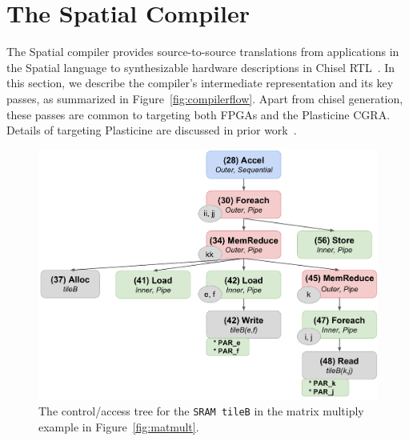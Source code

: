 \section{The Spatial Compiler}
\label{compiler}

The Spatial compiler provides source-to-source translations from applications in the Spatial language to synthesizable hardware descriptions in Chisel RTL~\cite{chisel}. 
In this section, we describe the compiler's intermediate representation and its key passes, as summarized in Figure~\ref{fig:compilerflow}.
Apart from chisel generation, these passes are common to targeting both FPGAs and the Plasticine CGRA. Details of targeting Plasticine are discussed in prior work~\cite{plasticine}.



\begin{figure}
\includegraphics[clip, width=0.9\columnwidth]{figs/control_tree_gemm.pdf}
\vspace{-10pt}
\caption{The control/access tree for the \texttt{\small{SRAM tileB}} in the matrix multiply example in Figure~\ref{fig:matmult}. 
\vspace{-5pt} 
}
\label{fig:controlTree}
\end{figure}

